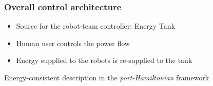 \documentclass[student]{ITRslides}
\begin{document}
\begin{frame}
	\frametitle{Overall control architecture}
	
	\begin{figure}
		\centering
		\def\svgwidth{0.99\columnwidth}
		
	\end{figure}
	\begin{itemize}
		\item Source for the robot-team controller: Energy Tank
		\item Human user controls the power flow
		\item Energy supplied to the robots is re-supplied to the tank
	\end{itemize}
	\begin{block}{}
		Energy-consistent description in the \emph{port-Hamiltonian} framework
		\end{block}
	
\end{frame}
\end{document}
